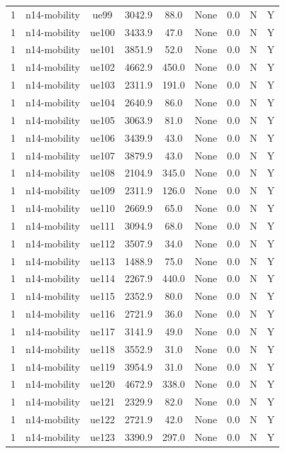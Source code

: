 \begin{table}[ht]
\begin{tabular}{|c|c|c|c|c|c|c|c|c|}
1 & n14-mobility & ue99 & 3042.9 & 88.0 & None & 0.0 & N & Y \\
1 & n14-mobility & ue100 & 3433.9 & 47.0 & None & 0.0 & N & Y \\
1 & n14-mobility & ue101 & 3851.9 & 52.0 & None & 0.0 & N & Y \\
1 & n14-mobility & ue102 & 4662.9 & 450.0 & None & 0.0 & N & Y \\
1 & n14-mobility & ue103 & 2311.9 & 191.0 & None & 0.0 & N & Y \\
1 & n14-mobility & ue104 & 2640.9 & 86.0 & None & 0.0 & N & Y \\
1 & n14-mobility & ue105 & 3063.9 & 81.0 & None & 0.0 & N & Y \\
1 & n14-mobility & ue106 & 3439.9 & 43.0 & None & 0.0 & N & Y \\
1 & n14-mobility & ue107 & 3879.9 & 43.0 & None & 0.0 & N & Y \\
1 & n14-mobility & ue108 & 2104.9 & 345.0 & None & 0.0 & N & Y \\
1 & n14-mobility & ue109 & 2311.9 & 126.0 & None & 0.0 & N & Y \\
1 & n14-mobility & ue110 & 2669.9 & 65.0 & None & 0.0 & N & Y \\
1 & n14-mobility & ue111 & 3094.9 & 68.0 & None & 0.0 & N & Y \\
1 & n14-mobility & ue112 & 3507.9 & 34.0 & None & 0.0 & N & Y \\
1 & n14-mobility & ue113 & 1488.9 & 75.0 & None & 0.0 & N & Y \\
1 & n14-mobility & ue114 & 2267.9 & 440.0 & None & 0.0 & N & Y \\
1 & n14-mobility & ue115 & 2352.9 & 80.0 & None & 0.0 & N & Y \\
1 & n14-mobility & ue116 & 2721.9 & 36.0 & None & 0.0 & N & Y \\
1 & n14-mobility & ue117 & 3141.9 & 49.0 & None & 0.0 & N & Y \\
1 & n14-mobility & ue118 & 3552.9 & 31.0 & None & 0.0 & N & Y \\
1 & n14-mobility & ue119 & 3954.9 & 31.0 & None & 0.0 & N & Y \\
1 & n14-mobility & ue120 & 4672.9 & 338.0 & None & 0.0 & N & Y \\
1 & n14-mobility & ue121 & 2329.9 & 82.0 & None & 0.0 & N & Y \\
1 & n14-mobility & ue122 & 2721.9 & 42.0 & None & 0.0 & N & Y \\
1 & n14-mobility & ue123 & 3390.9 & 297.0 & None & 0.0 & N & Y \\

\end{tabular}
\end{table}
